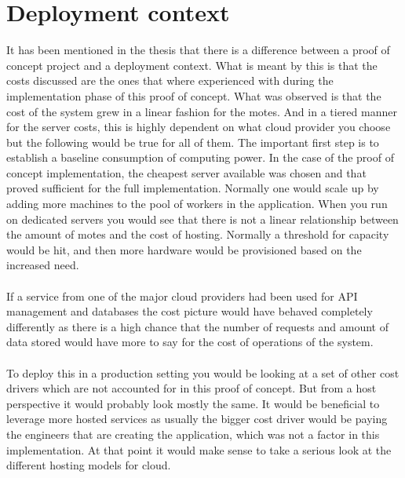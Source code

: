 \documentclass[]{uiophd}
\begin{document}
\section{Deployment context}
It has been mentioned in the thesis that there is a difference between a proof of concept project and a deployment context. What is meant by this is that the costs discussed are the ones that where experienced with during the implementation phase of this proof of concept. What was observed is that the cost of the system grew in a linear fashion for the motes. And in a tiered manner for the server costs, this is highly dependent on what cloud provider you choose but the following would be true for all of them. The important first step is to establish a baseline consumption of computing power. In the case of the proof of concept implementation, the cheapest server available was chosen and that proved sufficient for the full implementation. Normally one would scale up by adding more machines to the pool of workers in the application. When you run on dedicated servers you would see that there is not a linear relationship between the amount of motes and the cost of hosting. Normally a threshold for capacity would be hit, and then more hardware would be provisioned based on the increased need.
\\\\
If a service from one of the major cloud providers had been used for API management and databases the cost picture would have behaved completely differently as there is a high chance that the number of requests and amount of data stored would have more to say for the cost of operations of the system.
\\\\
To deploy this in a production setting you would be looking at a set of other cost drivers which are not accounted for in this proof of concept. But from a host perspective it would probably look mostly the same. It would be beneficial to leverage more hosted services as usually the bigger cost driver would be paying the engineers that are creating the application, which was not a factor in this implementation. At that point it would make sense to take a serious look at the different hosting models for cloud.
\\\\
\end{document}
